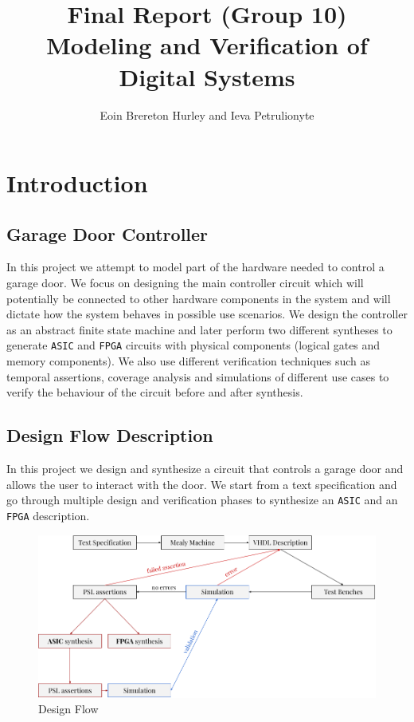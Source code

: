 \documentclass[a4paper,11pt]{article}
\title{\textbf{Final Report (Group 10)\protect\\Modeling and Verification of Digital Systems}}
\author{Eoin Brereton Hurley and Ieva Petrulionyte}
\date{}
\begin{document}
	\maketitle
    
    \section{Introduction}
    \subsection{Garage Door Controller}
    \par In this project we attempt to model part of the hardware needed to control a garage door. We focus on designing the main controller circuit which will potentially be connected to other hardware components in the system and will dictate how the system behaves in possible use scenarios. We design the controller as an abstract finite state machine and later perform two different syntheses to generate \texttt{ASIC} and \texttt{FPGA} circuits with physical components (logical gates and memory components). We also use different verification techniques such as temporal assertions, coverage analysis and simulations of different use cases to verify the behaviour of the circuit before and after synthesis.
    
    \subsection{Design Flow Description}
    \par In this project we design and synthesize a circuit that controls a garage door and allows the user to interact with the door. We start from a text specification and go through multiple design and verification phases to synthesize an \texttt{ASIC} and an \texttt{FPGA} description.
    
    \begin{figure}[H]
      \centering
      \includegraphics[width=0.8\linewidth]{design_flow.png}  
      \caption{Design Flow}
    \end{figure}
    
\end{document}
